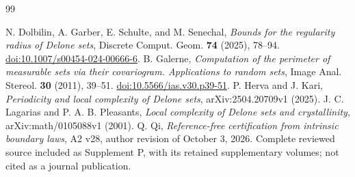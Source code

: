 \begin{thebibliography}{99}\raggedright
{}
N. Dolbilin, A. Garber, E. Schulte, and M. Senechal,
\emph{Bounds for the regularity radius of Delone sets},
Discrete Comput. Geom. \textbf{74} (2025), 78--94.
\href{https://doi.org/10.1007/s00454-024-00666-6}{doi:10.1007/s00454-024-00666-6}.
B. Galerne, \emph{Computation of the perimeter of measurable sets via
their covariogram. Applications to random sets}, Image Anal. Stereol.
\textbf{30} (2011), 39--51.
\href{https://doi.org/10.5566/ias.v30.p39-51}{doi:10.5566/ias.v30.p39-51}.
P. Herva and J. Kari, \emph{Periodicity and local complexity of Delone
sets}, arXiv:2504.20709v1 (2025).
J. C. Lagarias and P. A. B. Pleasants, \emph{Local complexity of Delone
sets and crystallinity}, arXiv:math/0105088v1 (2001).
Q. Qi, \emph{Reference-free certification from intrinsic boundary laws},
A2 v28, author revision of October 3, 2026. Complete reviewed source
included as Supplement P, with its retained supplementary volumes;
not cited as a journal publication.
\end{thebibliography}
